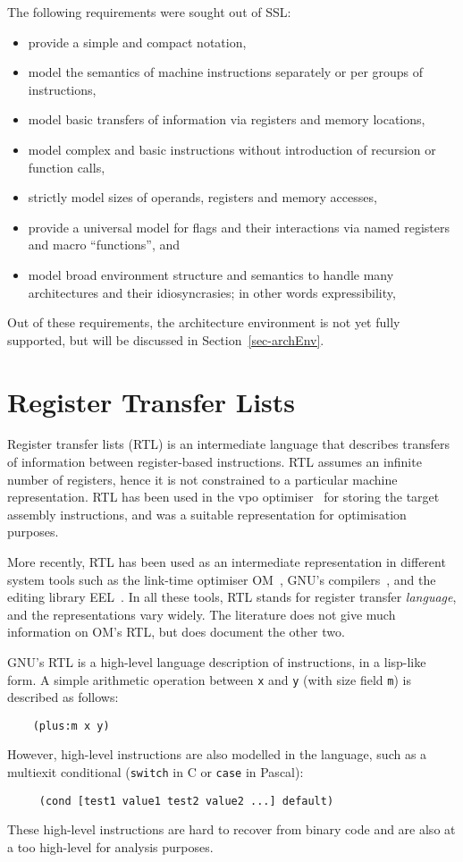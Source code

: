 The following requirements were sought out of SSL:
\begin{itemize}
\item provide a simple and compact notation, 
\item model the semantics of machine instructions separately or per
	groups of instructions, 
\item model basic transfers of information via registers and memory
	locations, 
\item model complex and basic instructions without introduction of
	recursion or function calls, 
\item strictly model sizes of operands, registers and memory accesses, 
\item provide a universal model for flags and their interactions 
	via named registers and macro ``functions'', and
\item model broad environment structure and semantics to handle many 
	architectures and their idiosyncrasies; in other words expressibility,
\end{itemize}
Out of these requirements, the architecture environment is not 
yet fully supported, but will be discussed in Section~\ref{sec-archEnv}.


\section{Register Transfer Lists} 
Register transfer lists (RTL) is an intermediate language
that describes transfers of information between register-based 
instructions.  RTL assumes an infinite number of registers, hence
it is not constrained to a particular machine representation.
RTL has been used in the vpo optimiser~\cite{Beni88} for storing 
the target assembly instructions, and was a suitable representation 
for optimisation purposes.

More recently, RTL has been used as an intermediate representation in 
different system tools such as the link-time optimiser OM~\cite{Sriv93,Dec94},
GNU's compilers~\cite{Stal93}, and the editing library EEL~\cite{Laru95}. 
In all these tools, RTL stands for register transfer \emph{language}, 
and the representations vary widely.
The literature does not give much information on OM's RTL, but does
document the other two. 

GNU's RTL is a high-level language description of instructions,
in a lisp-like form.  A simple arithmetic operation between \texttt{x} and
\texttt{y} (with size field \texttt{m}) is described as follows:
\begin{verbatim}
    (plus:m x y)
\end{verbatim}
However, high-level instructions are also modelled in the language,
such as a multiexit conditional (\texttt{switch} in C or \texttt{case}
in Pascal):
\begin{verbatim}
     (cond [test1 value1 test2 value2 ...] default)
\end{verbatim}
These high-level instructions are hard to recover from binary
code and are also at a too high-level for analysis purposes.

